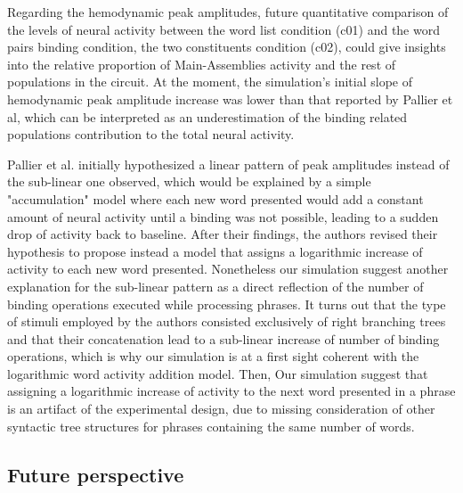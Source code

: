 \documentclass[10pt]{article}
\begin{document}
Regarding the hemodynamic peak amplitudes, future quantitative comparison of the levels of neural activity between the word list condition (c01) and the word pairs binding condition, the two constituents condition (c02), could give insights into the relative proportion of Main-Assemblies activity and the rest of populations in the circuit.
At the moment, the simulation's initial slope of hemodynamic peak amplitude increase was lower than that reported by Pallier et al, which can be interpreted as an underestimation of the binding related populations contribution to the total neural activity.

Pallier et al. initially hypothesized a linear pattern of peak amplitudes instead of the sub-linear one observed, which would be explained by a simple "accumulation" model where each new word presented would add a constant amount of neural activity until a binding was not possible, leading to a sudden drop of activity back to baseline.
After their findings, the authors revised their hypothesis to propose instead a model that assigns a logarithmic increase of activity to each new word presented.
Nonetheless our simulation suggest another explanation for the sub-linear pattern as a direct reflection of the number of binding operations executed while processing phrases.
It turns out that the type of stimuli employed by the authors consisted exclusively of right branching trees and that their concatenation lead to a sub-linear increase of number of binding operations, which is why our simulation is at a first sight coherent with the logarithmic word activity addition model.
Then, Our simulation suggest that assigning a logarithmic increase of activity to the next word presented in a phrase is an artifact of the experimental design, due to missing consideration of other syntactic tree structures for phrases containing the same number of words.


\subsection{Future perspective}
\end{document}
